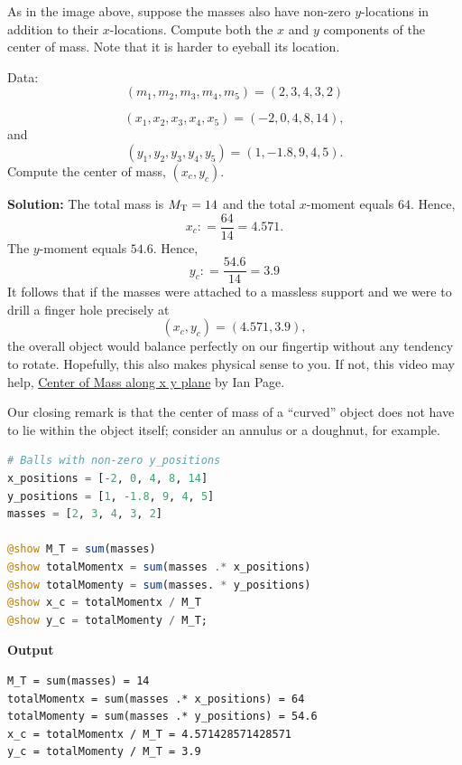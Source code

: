 \bigskip

\begin{example} As in the image above, suppose the masses also have non-zero $y$-locations in addition to their $x$-locations. Compute both the $x$ and $y$ components of the center of mass. Note that it is harder to eyeball its location.

Data:
$$(m_1, m_2, m_3, m_4, m_5) = (2, 3, 4, 3, 2)$$

$$(x_1, x_2, x_3, x_4, x_5) = (-2, 0, 4, 8, 14),$$
and
$$(y_1, y_2, y_3, y_4, y_5) = (1, -1.8, 9, 4, 5).$$
Compute the center of mass, $(x_c, y_c)$.
    
\end{example}

\textbf{Solution:}
The total mass is ${M_{\rm T}} = 14$ and  the total $x$-moment equals $64$. Hence, 
$$x_c: = \frac{64}{14} = 4.571.$$ The $y$-moment equals $54.6$. Hence, 
$$y_c: = \frac{54.6}{14} = 3.9$$
It follows that if the masses were attached to a massless support and we were to drill a finger hole precisely at 
$$(x_c, y_c) = (4.571, 3.9),$$
the overall object would balance perfectly on our fingertip without any tendency to rotate. 
Hopefully, this also makes physical sense to you. If not, this video may help, \href{https://www.youtube.com/watch?v=48eF4KR9jD0}{Center of Mass along x y plane} by Ian Page. 

Our closing remark is that the center of mass of a ``curved'' object does not have to lie within the object itself; consider an annulus or a doughnut, for example.

\bigskip

\begin{lstlisting}[language=Julia,style=mystyle]
# Balls with non-zero y_positions
x_positions = [-2, 0, 4, 8, 14]
y_positions = [1, -1.8, 9, 4, 5]
masses = [2, 3, 4, 3, 2]

@show M_T = sum(masses)
@show totalMomentx = sum(masses .* x_positions)
@show totalMomenty = sum(masses. * y_positions)
@show x_c = totalMomentx / M_T
@show y_c = totalMomenty / M_T;
\end{lstlisting}
\textbf{Output} 
\begin{verbatim}
M_T = sum(masses) = 14
totalMomentx = sum(masses .* x_positions) = 64
totalMomenty = sum(masses .* y_positions) = 54.6
x_c = totalMomentx / M_T = 4.571428571428571
y_c = totalMomenty / M_T = 3.9
\end{verbatim}

\bigskip


